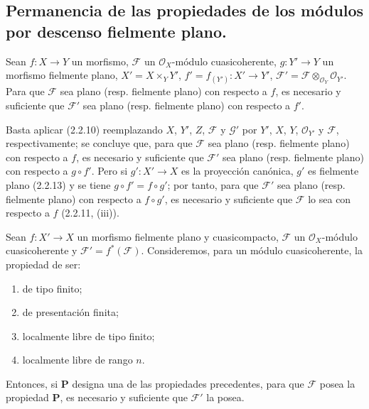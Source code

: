 \subsection{Permanencia de las propiedades de los módulos por descenso fielmente plano.}

\begin{proposition}[2.5.1]
\label{IV.2.5.1-fr}
Sean $f:X\to Y$ un morfismo, $\mathscr F$ un $\mathcal O_X$-módulo
cuasicoherente, $g:Y'\to Y$ un morfismo fielmente plano,
$X'=X\times_Y Y'$, $f'=f_{(Y')}:X'\to Y'$,
$\mathscr F'=\mathscr F\otimes_{\mathcal O_Y}\mathcal O_{Y'}$. Para que
$\mathscr F$ sea plano \textup{(resp.} fielmente plano) con respecto a $f$, es necesario
y suficiente que $\mathscr F'$ sea plano \textup{(resp.} fielmente plano) con respecto
a $f'$.
\end{proposition}

Basta aplicar (2.2.10) reemplazando $X$, $Y'$, $Z$, $\mathscr F$ y
$\mathscr G'$ por $Y'$, $X$, $Y$, $\mathcal O_{Y'}$ y $\mathscr F$,
respectivamente; se concluye que, para que $\mathscr F$ sea plano (resp.
fielmente plano) con respecto a $f$, es necesario y suficiente que
$\mathscr F'$ sea plano (resp. fielmente plano) con respecto a $g\circ f'$.
Pero si $g':X'\to X$ es la proyección canónica, $g'$ es fielmente plano
(2.2.13) y se tiene $g\circ f'=f\circ g'$; por tanto, para que $\mathscr F'$
sea plano (resp. fielmente plano) con respecto a $f\circ g'$, es necesario y
suficiente que $\mathscr F$ lo sea con respecto a $f$ (2.2.11, (iii)).

\begin{proposition}[2.5.2]
Sean $f:X'\to X$ un morfismo fielmente plano y cuasicompacto,
$\mathscr F$ un $\mathcal O_X$-módulo cuasicoherente y
$\mathscr F'=f^*(\mathscr F)$. Consideremos, para un módulo cuasicoherente,
la propiedad de ser:
\begin{enumerate}
\item[\textup{(i)}] de tipo finito;
\item[\textup{(ii)}] de presentación finita;
\item[\textup{(iii)}] localmente libre de tipo finito;
\item[\textup{(iv)}] localmente libre de rango $n$.
\end{enumerate}
Entonces, si $\boldsymbol{P}$ designa una de las propiedades precedentes, para que
$\mathscr F$ posea la propiedad $\boldsymbol{P}$, es necesario y suficiente que
$\mathscr F'$ la posea.
\end{proposition}

